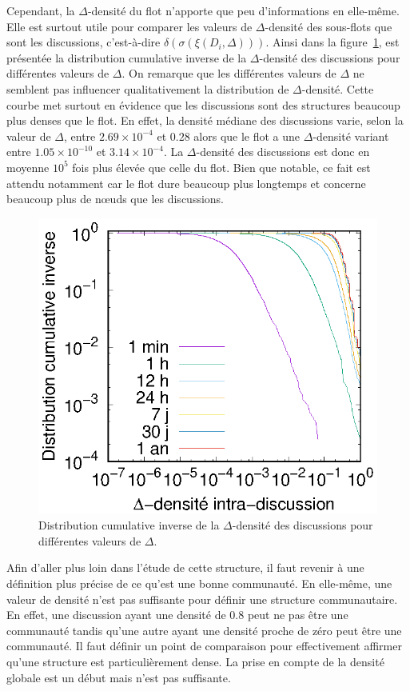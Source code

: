 Cependant, la $\Delta$-densité du flot n'apporte que peu d'informations en elle-même.
Elle est surtout utile pour comparer les valeurs de $\Delta$-densité des sous-flots que sont les discussions, c'est-à-dire $\delta(\sigma(\xi(D_i,\Delta)))$.
Ainsi dans la figure~\ref{fig:intra_dens_discussion}, est présentée la distribution cumulative inverse de la $\Delta$-densité des discussions pour différentes valeurs de $\Delta$.
On remarque que les différentes valeurs de $\Delta$ ne semblent pas influencer qualitativement la distribution de $\Delta$-densité.
Cette courbe met surtout en évidence que les discussions sont des structures beaucoup plus denses que le flot.
En effet, la densité médiane des discussions varie, selon la valeur de $\Delta$, entre $2.69 \times 10^{-4}$ et $0.28$ alors que le flot a une $\Delta$-densité variant entre $1.05  \times 10^{-10}$ et $3.14 \times 10^{-4}$.
La $\Delta$-densité des discussions est donc en moyenne $10^{5}$ fois plus élevée que celle du flot.
Bien que notable, ce fait est attendu notamment car le flot dure beaucoup plus longtemps et concerne beaucoup plus de n\oe{}uds que les discussions.
\begin{figure}
\centering
	\includegraphics[width=0.4\linewidth]{img/mailing/delta.eps}

\caption{Distribution cumulative inverse de la $\Delta$-densité des discussions pour différentes valeurs de $\Delta$.}
\label{fig:intra_dens_discussion}
\end{figure}

Afin d'aller plus loin dans l'étude de cette structure, il faut revenir à une définition plus précise de ce qu'est une bonne communauté.
En elle-même, une valeur de densité n'est pas suffisante pour définir une structure communautaire.
En effet, une discussion ayant une densité de $0.8$ peut ne pas être une communauté tandis qu'une autre ayant une densité proche de zéro peut être une communauté.
Il faut définir un point de comparaison pour effectivement affirmer qu'une structure est particulièrement dense.
La prise en compte de la densité globale est un début mais n'est pas suffisante.

